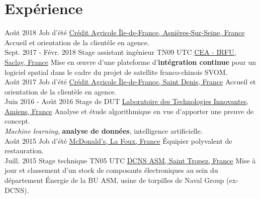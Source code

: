 \documentclass[a4paper]{twentysecondcv} %
\begin{document}
\section{Expérience}

\begin{twenty} %
    \twentyitem
    	{Août 2018}
		{}
        {Job d'été}
        {\href{https://ca-paris.com/}{Crédit Agricole Île-de-France, Asnières-Sur-Seine, France}}
        {}
        {Accueil et orientation de la clientèle en agence.}
    \\
    \twentyitem
    	{Sept. 2017 -}
		{Févr. 2018}
        {Stage assistant ingénieur TN09 UTC}
        {\href{http://irfu.cea.fr/}{CEA - IRFU, Saclay, France}}
        {}
        {Mise en œuvre d'une plateforme d'\textbf{intégration continue} pour un logiciel spatial dans le cadre du projet de satellite franco-chinois SVOM.}
    \\
    \twentyitem
    	{Août 2017}
		{}
        {Job d'été}
        {\href{https://ca-paris.com/}{Crédit Agricole Île-de-France, Saint Denis, France}}
        {}
        {Accueil et orientation de la clientèle en agence.}
    \\
	\twentyitem
    	{Juin 2016 -}
		{Août 2016}
        {Stage de DUT}
        {\href{http://lti-picardie.fr/}{Laboratoire des Technologies Innovantes, Amiens, France}}
        {}
        {Analyse et étude algorithmique en vue d'apporter une preuve de concept.\\\textit{Machine learning}, \textbf{analyse de données}, intelligence artificielle.}
    \\   
    \twentyitem
   		{Août 2015}
        {}
        {Job d'été}
        {\href{https://www.restaurants.mcdonalds.fr/mcdonalds-gassin}{McDonald's, La Foux, France}}
        {}
        {Équipier polyvalent de restauration.}
     \\
     \twentyitem
   		{Juill. 2015}
		{}
        {Stage technique TN05 UTC}
        {\href{https://www.naval-group.com/fr/}{DCNS ASM, Saint Tropez, France}}
        {}
        {Mise à jour et classement d'un stock de composants électroniques au sein du département Énergie de la BU ASM, usine de torpilles de Naval Group (ex-DCNS).}
        
\end{twenty}

\end{document}

